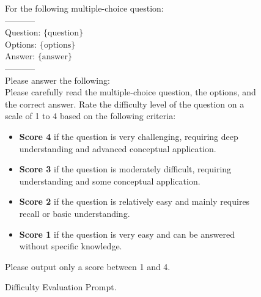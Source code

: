 \begin{figure}[h]
\centering
\begin{tcolorbox}[width=1\columnwidth, fontupper=\footnotesize,title=Difficulty Evaluation Prompt]
\RaggedRight
\obeylines

{For the following multiple-choice question:\\
-----------\\
Question: $\{\text{question}\}$\\
\vspace{3mm}
Options: $\{\text{options}\}$\\
\vspace{3mm}
Answer: $\{\text{answer}\}$\\
-----------\\
Please answer the following:\\

Please carefully read the multiple-choice question, the options, and the correct answer.  
Rate the difficulty level of the question on a scale of 1 to 4 based on the following criteria:
\begin{itemize}[label=-,nosep]
    \item \textbf{Score 4} if the question is very challenging, requiring deep understanding and advanced conceptual application.
    \item \textbf{Score 3} if the question is moderately difficult, requiring understanding and some conceptual application.
    \item \textbf{Score 2} if the question is relatively easy and mainly requires recall or basic understanding.
    \item \textbf{Score 1} if the question is very easy and can be answered without specific knowledge.
\end{itemize}

Please output only a score between 1 and 4.
}

\end{tcolorbox}
\caption{Difficulty Evaluation Prompt.}
\label{fig:difficulty_prompt}
\end{figure}




